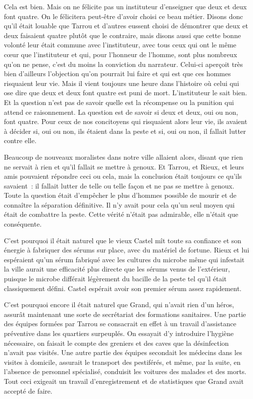 \documentclass[french,twoside]{book} %
\begin{document}
Cela est bien. Mais on ne félicite pas un instituteur d’enseigner que deux et deux font quatre. On le félicitera peut-être d’avoir choisi ce beau métier. Disons donc qu’il était louable que Tarrou et d’autres eussent choisi de démontrer que deux et deux faisaient quatre plutôt que le contraire, mais disons aussi que cette bonne volonté leur était commune avec l’instituteur, avec tous ceux qui ont le même cœur que l’instituteur et qui, pour l’honneur de l’homme, sont plus nombreux qu’on ne pense, c’est du moins la conviction du narrateur. Celui-ci aperçoit très bien d’ailleurs l’objection qu’on pourrait lui faire et qui est que ces hommes risquaient leur vie. Mais il vient toujours une heure dans l’histoire où celui qui ose dire que deux et deux font quatre est puni de mort. L’instituteur le sait bien. Et la question n’est pas de savoir quelle est la récompense ou la punition qui attend ce raisonnement. La question est de savoir si deux et deux, oui ou non, font quatre. Pour ceux de nos concitoyens qui risquaient alors leur vie, ils avaient à décider si, oui ou non, ils étaient dans la peste et si, oui ou non, il fallait lutter contre elle.\par
Beaucoup de nouveaux moralistes dans notre ville allaient alors, disant que rien ne servait à rien et qu’il fallait se mettre à genoux. Et Tarrou, et Rieux, et leurs amis pouvaient répondre ceci ou cela, mais la conclusion était toujours ce qu’ils savaient : il fallait lutter de telle ou telle façon et ne pas se mettre à genoux. Toute la question était d’empêcher le plus d’hommes possible de mourir et de connaître la séparation définitive. Il n’y avait pour cela qu’un seul moyen qui était de combattre la peste. Cette vérité n’était pas admirable, elle n’était que conséquente.\par
C’est pourquoi il était naturel que le vieux Castel mît toute sa confiance et son énergie à fabriquer des sérums sur place, avec du matériel de fortune. Rieux et lui espéraient qu’un sérum fabriqué avec les cultures du microbe même qui infestait la ville aurait une efficacité plus directe que les sérums venus de l’extérieur, puisque le microbe différait légèrement du bacille de la peste tel qu’il était classiquement défini. Castel espérait avoir son premier sérum assez rapidement.\par
C’est pourquoi encore il était naturel que Grand, qui n’avait rien d’un héros, assurât maintenant une sorte de secrétariat des formations sanitaires. Une partie des équipes formées par Tarrou se consacrait en effet à un travail d’assistance préventive dans les quartiers surpeuplés. On essayait d’y introduire l’hygiène nécessaire, on faisait le compte des greniers et des caves que la désinfection n’avait pas visités. Une autre partie des équipes secondait les médecins dans les visites à domicile, assurait le transport des pestiférés, et même, par la suite, en l’absence de personnel spécialisé, conduisit les voitures des malades et des morts. Tout ceci exigeait un travail d’enregistrement et de statistiques que Grand avait accepté de faire.\par
\end{document}
